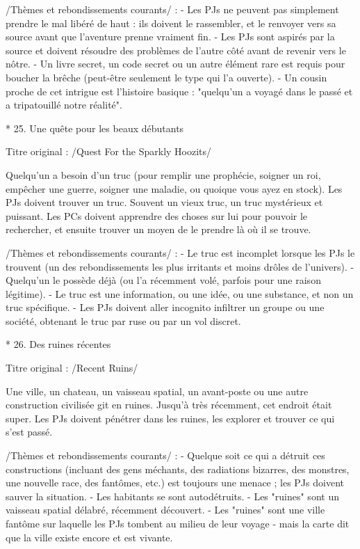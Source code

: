 \begin{enumerate}
/Thèmes et rebondissements courants/ :
- Les PJs ne peuvent pas simplement prendre le mal libéré de haut : ils doivent le rassembler, et le renvoyer vers sa source avant que l'aventure prenne vraiment fin.
- Les PJs sont aspirés par la source et doivent résoudre des problèmes de l'autre côté avant de revenir vers le nôtre.
- Un livre secret, un code secret ou un autre élément rare est requis pour boucher la brêche (peut-être seulement le type qui l'a ouverte).
- Un cousin proche de cet intrigue est l'histoire basique : "quelqu'un a voyagé dans le passé et a tripatouillé notre réalité".

* 25. Une quête pour les beaux débutants

Titre original : /Quest For the Sparkly Hoozits/

Quelqu'un a besoin d'un truc (pour remplir une prophécie, soigner un roi, empêcher une guerre, soigner une maladie, ou quoique vous ayez en stock). Les PJs doivent trouver un truc. Souvent un vieux truc, un truc mystérieux et puissant. Les PCs doivent apprendre des choses sur lui pour pouvoir le rechercher, et ensuite trouver un moyen de le prendre là où il se trouve.

/Thèmes et rebondissements courants/ :
- Le truc est incomplet lorsque les PJs le trouvent (un des rebondissements les plus irritants et moins drôles de l'univers).
- Quelqu'un le possède déjà (ou l'a récemment volé, parfois pour une raison légitime).
- Le truc est une information, ou une idée, ou une substance, et non un truc spécifique.
- Les PJs doivent aller incognito infiltrer un groupe ou une société, obtenant le truc par ruse ou par un vol discret.

* 26. Des ruines récentes

Titre original : /Recent Ruins/

Une ville, un chateau, un vaisseau spatial, un avant-poste ou une autre construction civilisée git en ruines. Jusqu'à très récemment, cet endroit était super. Les PJs doivent pénétrer dans les ruines, les explorer et trouver ce qui s'est passé.

/Thèmes et rebondissements courants/ :
- Quelque soit ce qui a détruit ces constructions (incluant des gens méchants, des radiations bizarres, des monstres, une nouvelle race, des fantômes, etc.) est toujours une menace ; les PJs doivent sauver la situation.
- Les habitants se sont autodétruits.
- Les "ruines" sont un vaisseau spatial délabré, récemment découvert.
- Les "ruines" sont une ville fantôme sur laquelle les PJs tombent au milieu de leur voyage - mais la carte dit que la ville existe encore et est vivante.


\end{enumerate}
